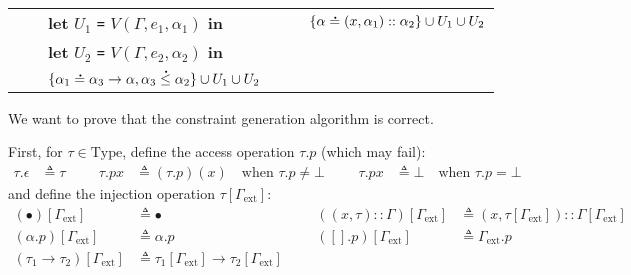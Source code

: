 \documentclass{article}
\theoremstyle{definition}
\newcommand*{\cons}{::}
\newcommand*{\A}[1]{\overset{\,_{\mbox{\Large .}}}{#1}}
\newcommand*{\Type}{\text{Type}}
\newcommand*{\external}{\Gamma_{\text{ext}}}
\begin{document}
\begin{tabular}{rclrcl}
                                 &              & \textbf{let} $U_1$ \texttt{=} $V(\Gamma,e_1,\alpha_1)$ \textbf{in}                   &                                            &              & $\{\alpha\A{=}(x,\alpha_1)\cons\alpha_2\}\cup U_1\cup U_2$                          \\
                                 &              & \textbf{let} $U_2$ \texttt{=} $V(\Gamma,e_2,\alpha_2)$ \textbf{in}                                                                                                                                                                     \\
                                 &              & $\{\alpha_1\A{=}\alpha_3\rightarrow\alpha,\alpha_3\A{\le}\alpha_2\}\cup U_1\cup U_2$
\end{tabular}

\vphantom{}

We want to prove that the constraint generation algorithm is correct.

First, for $\tau\in\Type$, define the access operation $\tau.p$ (which may fail):
\begin{align*}
  \tau.\epsilon & \triangleq\tau &  &  & \tau.px & \triangleq(\tau.p)(x)\quad\text{when }\tau.p\neq\bot &  &  & \tau.px & \triangleq\bot\quad\text{when }\tau.p=\bot
\end{align*}
and define the injection operation $\tau[\external]$:
\begin{align*}
  (\bullet)[\external]                 & \triangleq\bullet                                       &  &  & ((x,\tau)\cons\Gamma)[\external] & \triangleq(x,\tau[\external])\cons\Gamma[\external] \\
  (\alpha.p)[\external]                & \triangleq\alpha.p                                      &  &  & ([].p)[\external]                & \triangleq\external.p                               \\
  (\tau_1\rightarrow\tau_2)[\external] & \triangleq\tau_1[\external]\rightarrow\tau_2[\external]
\end{align*}
\end{document}
